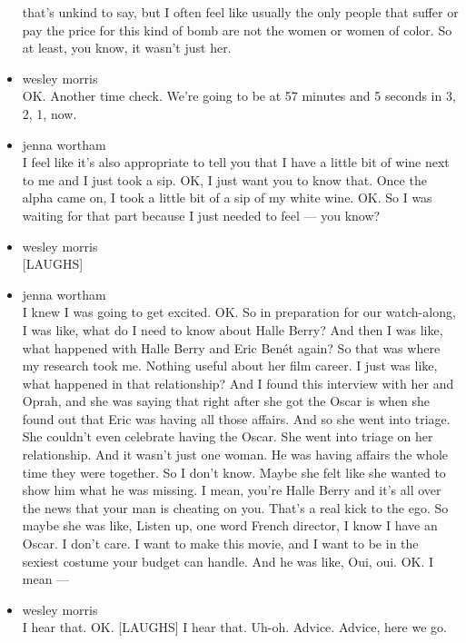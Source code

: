 \begin{itemize}
  that's unkind to say, but I often feel like usually the only people
  that suffer or pay the price for this kind of bomb are not the women
  or women of color. So at least, you know, it wasn't just her.
\item
  wesley morris\\
  OK. Another time check. We're going to be at 57 minutes and 5 seconds
  in 3, 2, 1, now.
\item
  jenna wortham\\
  I feel like it's also appropriate to tell you that I have a little bit
  of wine next to me and I just took a sip. OK, I just want you to know
  that. Once the alpha came on, I took a little bit of a sip of my white
  wine. OK. So I was waiting for that part because I just needed to feel
  --- you know?
\item
  wesley morris\\
  {[}LAUGHS{]}
\item
  jenna wortham\\
  I knew I was going to get excited. OK. So in preparation for our
  watch-along, I was like, what do I need to know about Halle Berry? And
  then I was like, what happened with Halle Berry and Eric Benét again?
  So that was where my research took me. Nothing useful about her film
  career. I just was like, what happened in that relationship? And I
  found this interview with her and Oprah, and she was saying that right
  after she got the Oscar is when she found out that Eric was having all
  those affairs. And so she went into triage. She couldn't even
  celebrate having the Oscar. She went into triage on her relationship.
  And it wasn't just one woman. He was having affairs the whole time
  they were together. So I don't know. Maybe she felt like she wanted to
  show him what he was missing. I mean, you're Halle Berry and it's all
  over the news that your man is cheating on you. That's a real kick to
  the ego. So maybe she was like, Listen up, one word French director, I
  know I have an Oscar. I don't care. I want to make this movie, and I
  want to be in the sexiest costume your budget can handle. And he was
  like, Oui, oui. OK. I mean ---
\item
  wesley morris\\
  I hear that. OK. {[}LAUGHS{]} I hear that. Uh-oh. Advice. Advice, here
  we go.


\end{itemize}
